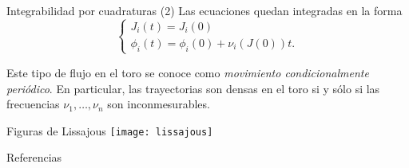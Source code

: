 \documentclass[mathserif]{beamer}
\begin{document}
\begin{frame}{Integrabilidad por cuadraturas (2)}
     Las ecuaciones quedan integradas en la forma
     \begin{equation*}
       \begin{cases}
	 J_i(t)=J_i(0) \\
	 \phi_i(t)=\phi_i(0)+\nu_i(J(0))t.
       \end{cases}
     \end{equation*}

     Este tipo de flujo en el toro se conoce como \emph{movimiento condicionalmente periódico}. En particular, las trayectorias son densas en el toro si y sólo si las frecuencias $\nu_1,\dots,\nu_n$ son inconmesurables.
\end{frame}

\begin{frame}{Figuras de Lissajous}
  \centering
  \texttt{[image: lissajous]}
\end{frame}

 \begin{frame}{Referencias}
   \nocite{*}
   
   
 \end{frame}

 \begin{frame}[plain]
 \end{frame}

\end{document}
